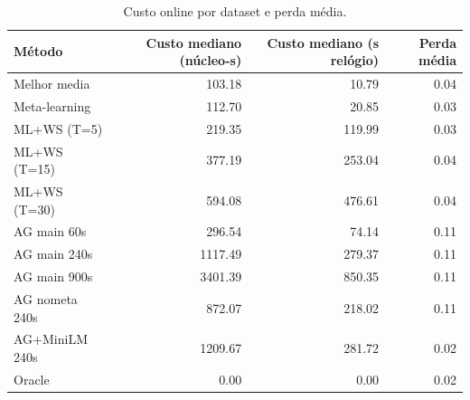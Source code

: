 \begin{table}[htbp]
\centering
\caption{Custo online por dataset e perda média.}
\label{tab:automl-custo}
\begin{tabular}{lrrr}
\toprule
Método & Custo mediano (núcleo-s) & Custo mediano (s relógio) & Perda média \\
\midrule
Melhor media & 103.18 & 10.79 & 0.04 \\
Meta-learning & 112.70 & 20.85 & 0.03 \\
ML+WS (T=5) & 219.35 & 119.99 & 0.03 \\
ML+WS (T=15) & 377.19 & 253.04 & 0.04 \\
ML+WS (T=30) & 594.08 & 476.61 & 0.04 \\
AG main 60s & 296.54 & 74.14 & 0.11 \\
AG main 240s & 1117.49 & 279.37 & 0.11 \\
AG main 900s & 3401.39 & 850.35 & 0.11 \\
AG nometa 240s & 872.07 & 218.02 & 0.11 \\
AG+MiniLM 240s & 1209.67 & 281.72 & 0.02 \\
Oracle & 0.00 & 0.00 & 0.02 \\
\bottomrule
\end{tabular}
\end{table}
